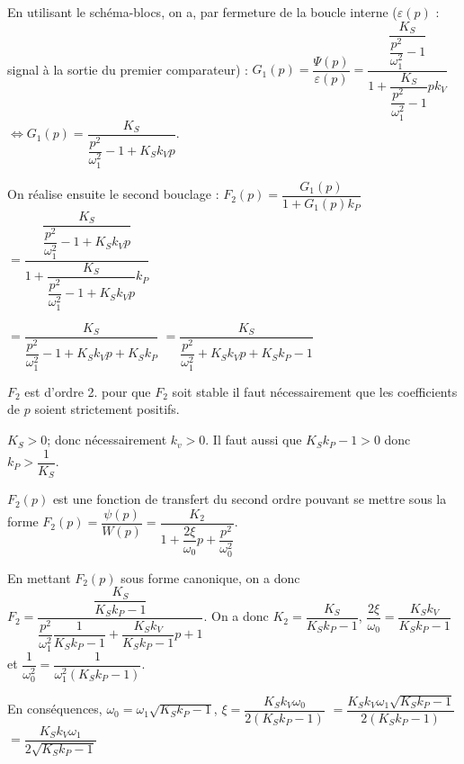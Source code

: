 \ifprof
\begin{corrige}
En utilisant le schéma-blocs, on a, par fermeture de la boucle interne ($\varepsilon(p)$ : signal à la sortie du premier comparateur) :
$G_1(p)= \dfrac{\Psi(p)}{\varepsilon(p)} = \dfrac{\dfrac{K_S}{\dfrac{p^2}{\omega_1^2}-1}}{1+\dfrac{K_S}{\dfrac{p^2}{\omega_1^2}-1}pk_V}$
$\Leftrightarrow G_1(p)  = \dfrac{K_S}{{\dfrac{p^2}{\omega_1^2}-1}+K_Sk_Vp}$.

On réalise ensuite le second bouclage : $F_2(p)=\dfrac{G_1(p)}{1+G_1(p)k_P}$
$ =\dfrac{ \dfrac{K_S}{{\dfrac{p^2}{\omega_1^2}-1}+K_Sk_Vp}}{1+ \dfrac{K_S}{{\dfrac{p^2}{\omega_1^2}-1}+K_Sk_Vp}k_P} $

$ =\dfrac{K_S}{{\dfrac{p^2}{\omega_1^2}-1+K_Sk_Vp}    + K_Sk_P} $
$ =\dfrac{K_S}{{\dfrac{p^2}{\omega_1^2}+K_Sk_Vp}    + K_Sk_P-1} $

$F_2$ est d'ordre 2. pour que $F_2$ soit stable il faut nécessairement que les coefficients de $p$ soient strictement positifs. 

$K_S>0$; donc nécessairement $k_v>0$. Il faut aussi que $K_Sk_P-1>0$ donc $k_P >\dfrac{1}{K_S}$.

\end{corrige}
\else
\fi


\ifprof
\else
$F_2(p)$ est une fonction de transfert du second ordre pouvant se mettre sous la forme 
$F_2(p)=\dfrac{\psi(p)}{W(p)}=\dfrac{K_2}{1+\dfrac{2\xi}{\omega_0}p+\dfrac{p^2}{\omega_0^2}}$.
\fi


\ifprof
\begin{corrige}
En mettant $F_2(p)$ sous forme canonique, on a donc
$ F_2=\dfrac{\dfrac{K_S}{ K_Sk_P-1}}{\dfrac{p^2}{\omega_1^2}\dfrac{1}{ K_Sk_P-1}+\dfrac{K_Sk_V}{ K_Sk_P-1}p    +1} $.
On a donc $K_2 = \dfrac{K_S}{ K_Sk_P-1}$, $\dfrac{2\xi}{\omega_0} = \dfrac{K_Sk_V}{ K_Sk_P-1}$ et $\dfrac{1}{\omega_0^2} = \dfrac{1}{\omega_1^2\left( K_Sk_P-1\right)}$.

En conséquences, $\omega_0 = \omega_1\sqrt{K_Sk_P-1}$, 
$\xi = \dfrac{K_Sk_V \omega_0}{2 \left(K_Sk_P-1\right)}$
$=\dfrac{K_Sk_V \omega_1\sqrt{K_Sk_P-1}}{2 \left(K_Sk_P-1\right)}$
$=\dfrac{K_Sk_V \omega_1}{2\sqrt{K_Sk_P-1}}$
\end{corrige}
\else
\fi

